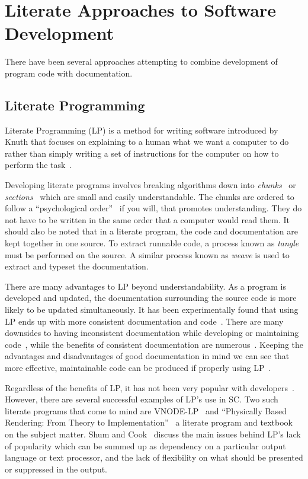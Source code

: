 \section{Literate Approaches to Software Development}

There have been several approaches attempting to combine development of program 
code with documentation.

\subsection{Literate Programming}

Literate Programming (LP) is a method for writing software introduced by Knuth 
that focuses on explaining to a human what we want a computer to do rather than 
simply writing a set of instructions for the computer on how to perform the 
task~\cite{Knuth1984}.

Developing literate programs involves breaking algorithms down into
\emph{chunks}~\cite{JohnsonAndJohnson1997} or \emph{sections}~\cite{Knuth1984}
which are small and easily understandable. The chunks are ordered to follow a 
``psychological order''~\cite{PieterseKourieAndBoake2004} if
you will, that promotes understanding. They do not have to be written in the 
same order that a computer would read them. It should also be noted that in a 
literate program, the code and documentation are kept together in one source. 
To extract runnable code, a process known as \emph{tangle} must be performed on 
the source. A similar process known as \emph{weave} is used to extract and 
typeset the documentation.

There are many advantages to LP beyond understandability. As a program is
developed and updated, the documentation surrounding the source code is more 
likely to be updated simultaneously. It has been experimentally found that 
using LP ends up with more consistent documentation and 
code~\cite{ShumAndCook1993}. There are many downsides to having inconsistent 
documentation while developing or maintaining 
code~\cite{Kotula2000,Thimbleby1986}, while the benefits of consistent 
documentation are numerous~\cite{Hyman1990, Kotula2000}. Keeping the advantages 
and disadvantages of good documentation in mind we can see that more effective, 
maintainable code can be produced if properly using 
LP~\cite{PieterseKourieAndBoake2004}.

Regardless of the benefits of LP, it has not been very popular with 
developers~\cite{ShumAndCook1993}. However, there are
several successful examples of LP's use in SC. Two such literate programs that 
come to mind are VNODE-LP~\cite{Nedialkov2006} and ``Physically Based 
Rendering: From Theory to Implementation''~\cite{PharrAndHumphreys2004} a 
literate program and textbook on the subject matter. Shum and 
Cook~\cite{ShumAndCook1993} discuss the main issues behind LP's lack of 
popularity which can be summed up as dependency on a 
particular output language or text processor, and the lack of flexibility on 
what should be presented or suppressed in the output.

